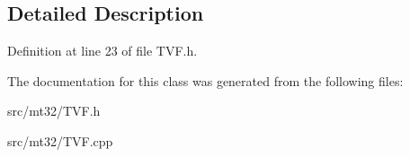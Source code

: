 \subsection{Detailed Description}


Definition at line 23 of file T\-V\-F.\-h.



The documentation for this class was generated from the following files\-:\begin{DoxyCompactItemize}
\item 
src/mt32/T\-V\-F.\-h\item 
src/mt32/T\-V\-F.\-cpp\end{DoxyCompactItemize}
